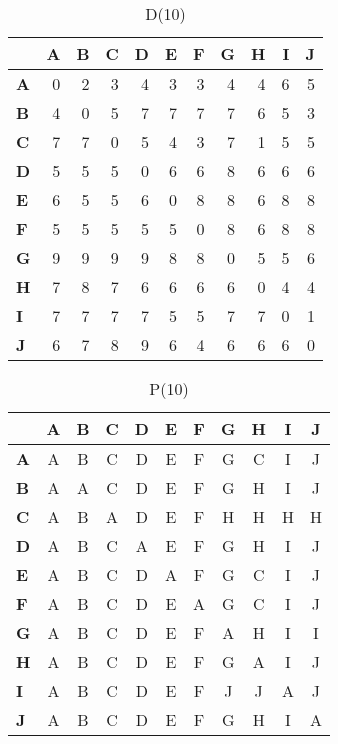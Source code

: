 \documentclass{article}
\begin{document}
\begin{table}[H]\centering
\caption{D(10)}
\begin{tabular}{l r r r r r r r r r r}
\toprule
 & \textbf{A} & \textbf{B} & \textbf{C} & \textbf{D} & \textbf{E} & \textbf{F} & \textbf{G} & \textbf{H} & \textbf{I} & \textbf{J}\\\midrule
\textbf{A} & 0 & 2 & 3 & 4 & 3 & 3 & 4 & 4 & 6 & 5 \\
\textbf{B} & 4 & 0 & 5 & 7 & 7 & 7 & 7 & 6 & 5 & 3 \\
\textbf{C} & 7 & 7 & 0 & 5 & 4 & 3 & 7 & 1 & 5 & 5 \\
\textbf{D} & 5 & 5 & 5 & 0 & 6 & 6 & 8 & 6 & 6 & 6 \\
\textbf{E} & 6 & 5 & 5 & 6 & 0 & 8 & 8 & 6 & 8 & 8 \\
\textbf{F} & 5 & 5 & 5 & 5 & 5 & 0 & 8 & 6 & 8 & 8 \\
\textbf{G} & 9 & 9 & 9 & 9 & 8 & 8 & 0 & 5 & 5 & 6 \\
\textbf{H} & 7 & 8 & 7 & 6 & 6 & 6 & 6 & 0 & 4 & 4 \\
\textbf{I} & 7 & 7 & 7 & 7 & 5 & 5 & \cellcolor{yellow!30}7 & \cellcolor{yellow!30}7 & 0 & 1 \\
\textbf{J} & 6 & 7 & 8 & 9 & 6 & 4 & 6 & 6 & 6 & 0 \\
\bottomrule
\end{tabular}
\end{table}

\begin{table}[H]\centering
\caption{P(10)}
\begin{tabular}{l c c c c c c c c c c}
\toprule
 & \textbf{A} & \textbf{B} & \textbf{C} & \textbf{D} & \textbf{E} & \textbf{F} & \textbf{G} & \textbf{H} & \textbf{I} & \textbf{J}\\\midrule
\textbf{A} & A & B & C & D & E & F & G & C & I & J \\
\textbf{B} & A & A & C & D & E & F & G & H & I & J \\
\textbf{C} & A & B & A & D & E & F & H & H & H & H \\
\textbf{D} & A & B & C & A & E & F & G & H & I & J \\
\textbf{E} & A & B & C & D & A & F & G & C & I & J \\
\textbf{F} & A & B & C & D & E & A & G & C & I & J \\
\textbf{G} & A & B & C & D & E & F & A & H & I & I \\
\textbf{H} & A & B & C & D & E & F & G & A & I & J \\
\textbf{I} & A & B & C & D & E & F & \cellcolor{yellow!30}J & \cellcolor{yellow!30}J & A & J \\
\textbf{J} & A & B & C & D & E & F & G & H & I & A \\
\bottomrule
\end{tabular}
\end{table}
\end{document}
